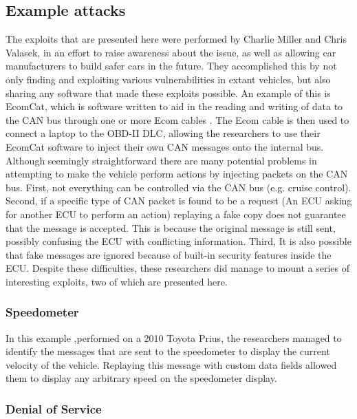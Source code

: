 \subsection{Example attacks}
\label{subsec:example_attacks}
The exploits that are presented here were performed by Charlie Miller and Chris Valasek, in an effort to raise awareness about the issue, as well as allowing car manufacturers to build safer cars in the future. They accomplished this by not only finding and exploiting various vulnerabilities in extant vehicles, but also sharing any software that made these exploits possible. An example of this is EcomCat, which is software written to aid in the reading and writing of data to the CAN bus through one or more Ecom cables \cite{MillerC}. The Ecom cable is then used to connect a laptop to the OBD-II DLC, allowing the researchers to use their EcomCat software to inject their own CAN messages onto the internal bus. Although seemingly straightforward there are many potential problems in attempting to make the vehicle perform actions by injecting packets on the CAN bus. First, not everything can be controlled via the CAN bus (e.g. cruise control). Second, if a specific type of CAN packet is found to be a request (An ECU asking for another ECU to perform an action) replaying a fake copy does not guarantee that the message is accepted. This is because the original message is still sent, possibly confusing the ECU with conflicting information. Third, It is also possible that fake messages are ignored because of built-in security features inside the ECU. Despite these difficulties, these researchers did manage to mount a series of interesting exploits, two of which are presented here.

\subsubsection{Speedometer} 
\label{subsec:speedometer}

In this example ,performed on a 2010 Toyota Prius, the researchers managed to identify the messages that are sent to the speedometer to display the current velocity of the vehicle. Replaying this message with custom data fields allowed them to display any arbitrary speed on the speedometer display.

\subsubsection{Denial of Service} 
\label{subsec:denial_of_service}

